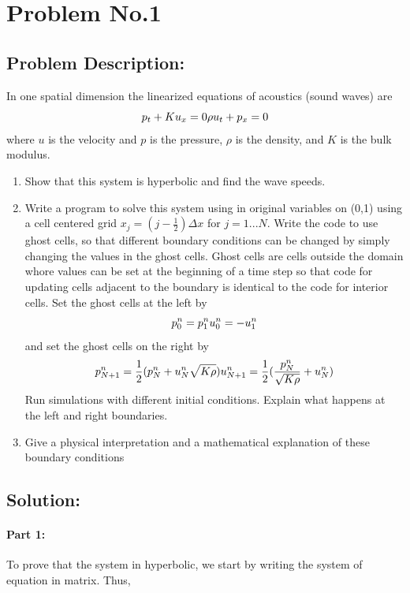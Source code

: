 \section{Problem No.1} \label{sec:prob2}
\subsection{Problem Description:} 
In one spatial dimension the linearized equations of acoustics (sound waves) are
$$
p_{t} + Ku_{x}=0\\
\rho u_{t}+p_{x}=0
$$
where $u$ is the velocity and $p$ is the pressure, $\rho$ is the density, and $K$ is the bulk modulus.
\begin{enumerate}
\item Show that this system is hyperbolic and find the wave speeds.
\item Write a program to solve this system using \protect{\lw} in original variables on (0,1) using a cell centered grid $x_{j}=(j-\frac{1}{2})\Delta x$ for $j=1...N.$ Write the code to use ghost cells, so that different boundary conditions can be changed by simply changing the values in the ghost cells. Ghost cells are cells outside the domain whore values can be set at the beginning of a time step so that code for updating cells adjacent to the boundary is identical to the code for interior cells.
Set the ghost cells at the left by 
$$
p_{0}^{n}=p_{1}^{n}\\
u_{0}^{n}=-u_{1}^{n}
$$
and set the ghost cells on the right by
$$
p_{N+1}^{n} = \frac{1}{2}(p_{N}^{n}+u_{N}^{n}\sqrt{K\rho})\\
u_{N+1}^{n} = \frac{1}{2}(\frac{p_{N}^{n}}{\sqrt{K\rho}} + u_{N}^{n})
$$
Run simulations with different initial conditions. Explain what happens at the left and right boundaries. 
\item Give a physical interpretation and a mathematical explanation of these boundary conditions

\end{enumerate}


\subsection{Solution:} 
\paragraph{Part 1:} To prove that the system in hyperbolic, we start by writing the system of equation in matrix. Thus,

